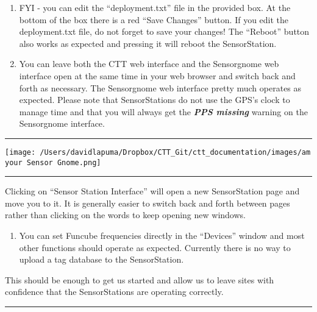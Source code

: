 \documentclass[
]{article}
\providecommand{\tightlist}{%
  \setlength{\itemsep}{0pt}\setlength{\parskip}{0pt}}
\begin{document}
\begin{enumerate}
\def\labelenumi{\arabic{enumi}.}
\setcounter{enumi}{11}
\item
  FYI - you can edit the ``deployment.txt'' file in the provided box. At
  the bottom of the box there is a red ``Save Changes'' button. If you
  edit the deployment.txt file, do not forget to save your changes! The
  ``Reboot'' button also works as expected and pressing it will reboot
  the SensorStation.
\item
  You can leave both the CTT web interface and the Sensorgnome web
  interface open at the same time in your web browser and switch back
  and forth as necessary. The Sensorgnome web interface pretty much
  operates as expected. Please note that SensorStations do not use the
  GPS's clock to manage time and that you will always get the
  \textbf{\emph{PPS missing}} warning on the Sensorgnome interface.
\end{enumerate}

\begin{center}\rule{0.5\linewidth}{0.5pt}\end{center}

\texttt{[image: /Users/davidlapuma/Dropbox/CTT\_Git/ctt\_documentation/images/am your Sensor Gnome.png]}

\begin{center}\rule{0.5\linewidth}{0.5pt}\end{center}

Clicking on ``Sensor Station Interface'' will open a new SensorStation
page and move you to it. It is generally easier to switch back and forth
between pages rather than clicking on the words to keep opening new
windows.

\begin{enumerate}
\def\labelenumi{\arabic{enumi}.}
\setcounter{enumi}{13}
\tightlist
\item
  You can set Funcube frequencies directly in the ``Devices'' window and
  most other functions should operate as expected. Currently there is no
  way to upload a tag database to the SensorStation.
\end{enumerate}

This should be enough to get us started and allow us to leave sites with
confidence that the SensorStations are operating correctly.

\begin{center}\rule{0.5\linewidth}{0.5pt}\end{center}
\end{document}
